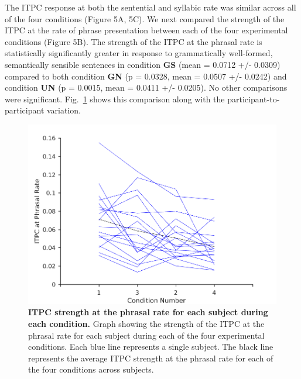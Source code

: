 \documentclass[a4paper,10pt,twoside]{article}
\begin{document}
The ITPC response at both the sentential and syllabic rate was similar across all of the four conditions (Figure 5A, 5C). We next compared the strength of the ITPC at the rate of phrase presentation between each of the four experimental conditions (Figure 5B). The strength of the ITPC at the phrasal rate is statistically significantly greater in response to grammatically well-formed, semantically sensible sentences in  condition \textbf{GS} (mean = 0.0712 +/- 0.0309) compared to both condition \textbf{GN} (p = 0.0328, mean = 0.0507 +/- 0.0242) and condition \textbf{UN} (p = 0.0015, mean = 0.0411 +/- 0.0205). No other comparisons were significant. Fig.~\ref{PhraseITPC} shows this comparison along with the participant-to-participant variation.

\begin{figure}[tbhp]
\includegraphics[width=\linewidth]{ITPC_peak_joined_for_participant_ordered_conditions_phrase_phrasal_rate.png}
\caption{\textbf{ITPC strength at the phrasal rate for each subject during each condition.} Graph showing the strength of the ITPC at the phrasal rate for each subject during each of the four experimental conditions. Each blue line represents a single subject. The black line represents the average ITPC strength at the phrasal rate for each of the four conditions across subjects.}
\label{PhraseITPC}
\end{figure}
\end{document}
